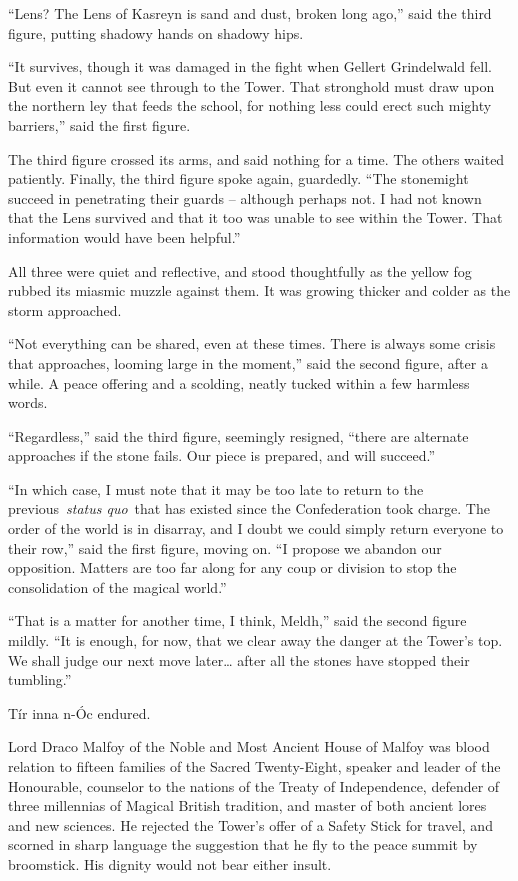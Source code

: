 ``Lens? The Lens of Kasreyn is sand and dust, broken long ago,'' said
the third figure, putting shadowy hands on shadowy hips.

``It survives, though it was damaged in the fight when Gellert
Grindelwald fell. But even it cannot see through to the Tower. That
stronghold must draw upon the northern ley that feeds the school, for
nothing less could erect such mighty barriers,'' said the first figure.

The third figure crossed its arms, and said nothing for a time. The
others waited patiently. Finally, the third figure spoke again,
guardedly. ``The stonemight succeed in penetrating their guards --
although perhaps not. I had not known that the Lens survived and that it
too was unable to see within the Tower. That information would have been
helpful.''

All three were quiet and reflective, and stood thoughtfully as the
yellow fog rubbed its miasmic muzzle against them. It was growing
thicker and colder as the storm approached.

``Not everything can be shared, even at these times. There is always
some crisis that approaches, looming large in the moment,'' said the
second figure, after a while. A peace offering and a scolding, neatly
tucked within a few harmless words.

``Regardless,'' said the third figure, seemingly resigned, ``there are
alternate approaches if the stone fails. Our piece is prepared, and will
succeed.''

``In which case, I must note that it may be too late to return to the
previous~\emph{status quo}~that has existed since the Confederation took
charge. The order of the world is in disarray, and I doubt we could
simply return everyone to their row,'' said the first figure, moving on.
``I propose we abandon our opposition. Matters are too far along for any
coup or division to stop the consolidation of the magical world.''

``That is a matter for another time, I think, Meldh,'' said the second
figure mildly. ``It is enough, for now, that we clear away the danger at
the Tower's top. We shall judge our next move later\ldots{} after all
the stones have stopped their tumbling.''

Tír inna n-Óc endured.

\mybreak

Lord Draco Malfoy of the Noble and Most Ancient House of Malfoy was
blood relation to fifteen families of the Sacred Twenty-Eight, speaker
and leader of the Honourable, counselor to the nations of the Treaty of
Independence, defender of three millennias of Magical British tradition,
and master of both ancient lores and new sciences. He rejected the
Tower's offer of a Safety Stick for travel, and scorned in sharp
language the suggestion that he fly to the peace summit by broomstick.
His dignity would not bear either insult.

